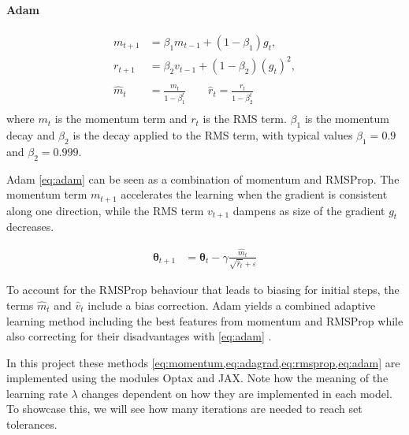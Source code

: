 \documentclass[reprint,english,notitlepage]{revtex4-2}  %
\begin{document}
\paragraph{Adam}
\begin{equation}
\begin{aligned}
m_{t+1} &= \beta_1 m_{t-1} + (1-\beta_1)g_t, \\
r_{t+1} &= \beta_2 v_{t-1} + (1-\beta_2)(g_t)^2, \\\\
\hat{m}_{t} &= \frac{m_{t}}{1-\beta_1^t}  \qquad
\hat{r}_{t} = \frac{r_{t}}{1-\beta_2^t} \\
\label{eq:adam_parts}
\end{aligned}
\end{equation}
where $m_t$ is the momentum term and $r_t$ is the RMS term. $\beta_1$ is the momentum decay and $\beta_2$ is the decay applied to the RMS term, with typical values $\beta_1 = 0.9$ and $\beta_2 = 0.999$. 

Adam \eqref{eq:adam} can be seen as a combination of momentum and RMSProp. The momentum term $m_{t+1}$ accelerates the learning when the gradient is consistent along one direction, while the RMS term $v_{t+1}$ dampens as size of the gradient $g_t$ decreases. 


\begin{equation}
\begin{aligned}
\bm{\theta}_{t+1} &= \bm{\theta}_{t}
 - \gamma \frac{\hat{m}_{t}}{\sqrt{\hat{r}_{t}}+\varepsilon}
\end{aligned}
\label{eq:adam}
\end{equation}

To account for the RMSProp behaviour that leads to biasing for initial steps, the terms $\hat{m}_t$ and $\hat{v}_t$ include a bias correction. Adam yields a combined adaptive learning method including the best features from momentum and RMSProp while also correcting for their disadvantages with \eqref{eq:adam} \cite{addition_w38}.  

In this project these methods \cref{eq:momentum,eq:adagrad,eq:rmsprop,eq:adam} are implemented using the modules Optax and JAX. Note how the meaning of the learning rate $\lambda$ changes dependent on how they are implemented in each model. To showcase this, we will see how many iterations are needed to reach set tolerances. 
\end{document}
